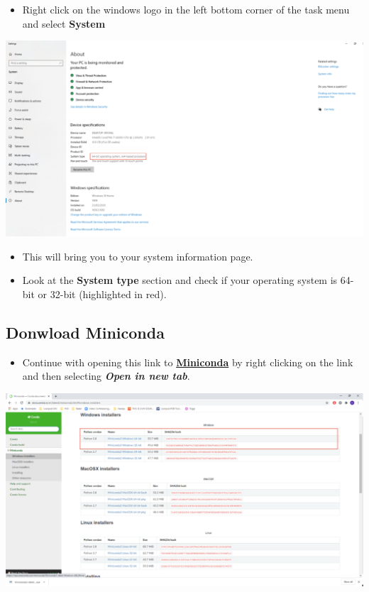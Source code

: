 \documentclass[
]{book}
\providecommand{\tightlist}{%
  \setlength{\itemsep}{0pt}\setlength{\parskip}{0pt}}
\begin{document}
\begin{itemize}
\tightlist
\item
  Right click on the windows logo in the left bottom corner of the task menu and select \textbf{System}
\end{itemize}

\begin{center}\includegraphics[width=29.85in]{figs/chp4/Picture8} \end{center}

\begin{itemize}
\tightlist
\item
  This will bring you to your system information page.
\item
  Look at the \textbf{System type} section and check if your operating system is 64-bit or 32-bit (highlighted in red).
\end{itemize}

\hypertarget{donwload-miniconda}{%
\subsection*{Donwload Miniconda}\label{donwload-miniconda}}

\begin{itemize}
\tightlist
\item
  Continue with opening this link to \href{https://docs.conda.io/en/latest/miniconda.html\#windows-installers}{\textbf{Miniconda}} by right clicking on the link and then selecting \textbf{\emph{Open in new tab}}.
\end{itemize}

\begin{center}\includegraphics[width=29.86in]{figs/chp4/Picture10} \end{center}
\end{document}
